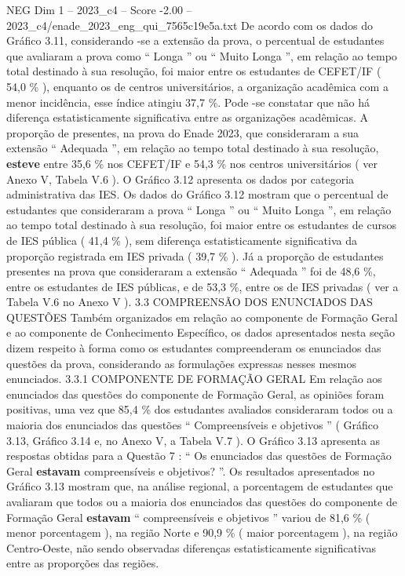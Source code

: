 \begin{textsample}{NEG Dim 1 – 2023\_c4 – Score -2.00 – 2023\_c4/enade\_2023\_eng\_qui\_7565c19e5a.txt}
De acordo com os dados do Gráfico 3.11, considerando -se a extensão da prova, o percentual de estudantes que avaliaram a prova como “ Longa ” ou “ Muito Longa ”, em relação ao tempo total destinado à sua resolução, foi maior entre os estudantes de CEFET/IF ( 54,0 \% ), enquanto os de centros universitários, a organização acadêmica com a menor incidência, esse índice atingiu 37,7 \%.
Pode -se constatar que não há diferença estatisticamente significativa entre as organizações acadêmicas.
A proporção de presentes, na prova do Enade 2023, que consideraram a sua extensão “ Adequada ”, em relação ao tempo total destinado à sua resolução, \textbf{esteve} entre 35,6 \% nos CEFET/IF e 54,3 \% nos centros universitários ( ver Anexo V, Tabela V.6 ).
O Gráfico 3.12 apresenta os dados por categoria administrativa das IES.
Os dados do Gráfico 3.12 mostram que o percentual de estudantes que consideraram a prova “ Longa ” ou “ Muito Longa ”, em relação ao tempo total destinado à sua resolução, foi maior entre os estudantes de cursos de IES pública ( 41,4 \% ), sem diferença estatisticamente significativa da proporção registrada em IES privada ( 39,7 \% ).
Já a proporção de estudantes presentes na prova que consideraram a extensão “ Adequada ” foi de 48,6 \%, entre os estudantes de IES públicas, e de 53,3 \%, entre os de IES privadas ( ver a Tabela V.6 no Anexo V ). 3.3 COMPREENSÃO DOS ENUNCIADOS DAS QUESTÕES Também organizados em relação ao componente de Formação Geral e ao componente de Conhecimento Específico, os dados apresentados nesta seção dizem respeito à forma como os estudantes compreenderam os enunciados das questões da prova, considerando as formulações expressas nesses mesmos enunciados. 3.3.1 COMPONENTE DE FORMAÇÃO GERAL Em relação aos enunciados das questões do componente de Formação Geral, as opiniões foram positivas, uma vez que 85,4 \% dos estudantes avaliados consideraram todos ou a maioria dos enunciados das questões “ Compreensíveis e objetivos ” ( Gráfico 3.13, Gráfico 3.14 e, no Anexo V, a Tabela V.7 ).
O Gráfico 3.13 apresenta as respostas obtidas para a Questão 7 : “ Os enunciados das questões de Formação Geral \textbf{estavam} compreensíveis e objetivos? ”.
Os resultados apresentados no Gráfico 3.13 mostram que, na análise regional, a porcentagem de estudantes que avaliaram que todos ou a maioria dos enunciados das questões do componente de Formação Geral \textbf{estavam} “ compreensíveis e objetivos ” variou de 81,6 \% ( menor porcentagem ), na região Norte e 90,9 \% ( maior porcentagem ), na região Centro-Oeste, não sendo observadas diferenças estatisticamente significativas entre as proporções das regiões.

\end{textsample}

